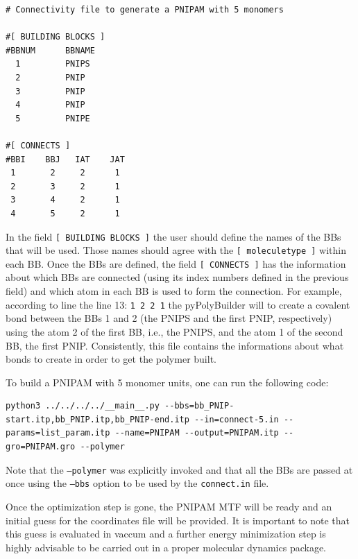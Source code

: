 \begin{lstlisting}
# Connectivity file to generate a PNIPAM with 5 monomers

#[ BUILDING BLOCKS ]
#BBNUM      BBNAME
  1     	PNIPS
  2     	PNIP
  3     	PNIP
  4	        PNIP
  5         PNIPE

#[ CONNECTS ]
#BBI    BBJ   IAT    JAT
 1       2     2      1
 2       3     2      1
 3       4     2      1
 4       5     2      1
\end{lstlisting}

In the field \texttt{[ BUILDING BLOCKS ]} the user should define the names of the BBs that will be used.
Those names should agree with the \texttt{[ moleculetype ]} within each BB.
Once the BBs are defined, the field \texttt{[ CONNECTS ]} has the information about which BBs are connected (using its index numbers defined in the previous field) and which atom in each BB is used to form the connection.
For example, according to line the line 13: \texttt{1       2     2      1} the pyPolyBuilder will to create a covalent bond between the BBs 1 and 2 (the PNIPS and the first PNIP, respectively) using the atom 2 of the first BB, i.e., the PNIPS, and the atom 1 of the second BB, the first PNIP.
Consistently, this file contains the informations about what bonds to create in order to get the polymer built.

To build a PNIPAM with 5 monomer units, one can run the following code:

\begin{lstlisting}
python3 ../../../../__main__.py --bbs=bb_PNIP-start.itp,bb_PNIP.itp,bb_PNIP-end.itp --in=connect-5.in --params=list_param.itp --name=PNIPAM --output=PNIPAM.itp --gro=PNIPAM.gro --polymer
\end{lstlisting}

Note that the \texttt{--polymer} was explicitly invoked and that all the BBs are passed at once using the \texttt{--bbs} option to be used by the \texttt{connect.in} file.

Once the optimization step is gone, the PNIPAM MTF will be ready and an initial guess for the coordinates file will be provided.
It is important to note that this guess is evaluated in vaccum and a further energy minimization step is highly advisable to be carried out in a proper molecular dynamics package.

